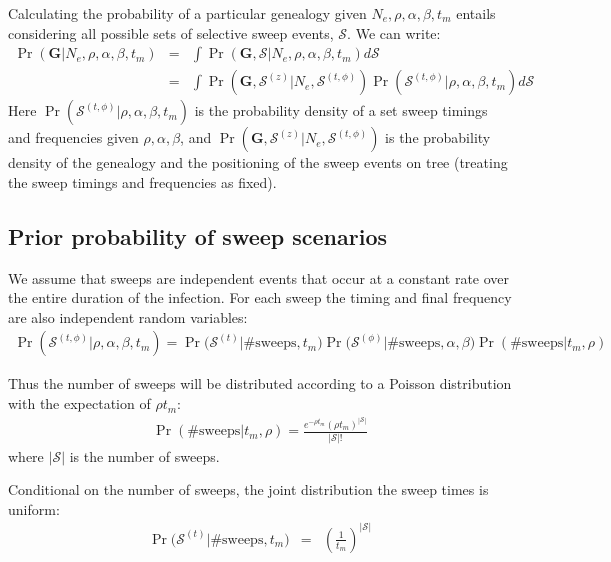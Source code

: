 \documentclass[letterpaper]{article}
\newcommand{\genealogy}{{\ensuremath{\mathbf{G}}}}
\newcommand{\popsize}{{\ensuremath{N_e}}}
\newcommand{\ratesweep}{{\ensuremath{\rho}}}
\newcommand{\sweepalpha}{{\ensuremath{\alpha}}}
\newcommand{\sweepbeta}{{\ensuremath{\beta}}}
\newcommand{\selectionmodel}{{\ensuremath{\ratesweep,\sweepalpha,\sweepbeta}}}
\newcommand{\entireSweepSet}{{\ensuremath{\mathcal{S}}}}
\newcommand{\sweepsetLocs}{{\ensuremath{\entireSweepSet^{(z)}}}}
\newcommand{\sweepsetTFs}{{\ensuremath{\entireSweepSet^{(t,\phi)}}}}
\begin{document}
Calculating the probability of a particular genealogy given $\popsize,\selectionmodel, t_m$ entails considering all possible sets of selective sweep events, $\entireSweepSet$.
We can write:
\begin{eqnarray}
\Pr(\genealogy | \popsize, \selectionmodel, t_m) & = & \int\Pr(\genealogy, \entireSweepSet | \popsize, \selectionmodel, t_m) d \entireSweepSet \\
& = & \int\Pr(\genealogy, \sweepsetLocs | \popsize, \sweepsetTFs)\Pr(\sweepsetTFs |\selectionmodel, t_m) d \entireSweepSet
\end{eqnarray}
Here $\Pr(\sweepsetTFs |\selectionmodel,t_m)$ is the probability density of a set sweep timings and frequencies given
$\selectionmodel$, and  $\Pr(\genealogy, \sweepsetLocs | \popsize, \sweepsetTFs)$ is the probability density of the genealogy and the positioning of the sweep events on tree (treating the sweep timings and frequencies as fixed).

\subsection{Prior probability of sweep scenarios}
We assume that sweeps are independent events that occur at a constant rate over the entire duration of the infection.
For each sweep the timing and final frequency are also independent random variables:
\begin{eqnarray}
\Pr(\sweepsetTFs |\selectionmodel,t_m) = \Pr\Big(\entireSweepSet^{(t)} \Big| \mbox{\# sweeps}, t_m\Big)\Pr\Big(\entireSweepSet^{(\phi)} \Big| \mbox{\# sweeps}, \sweepalpha, \sweepbeta\Big)\Pr(\mbox{\# sweeps}|t_m, \ratesweep)
\end{eqnarray}


Thus the number of sweeps will be distributed according to a Poisson distribution with the expectation of $\ratesweep t_m$:
\begin{eqnarray}
\Pr(\mbox{\# sweeps}|t_m, \ratesweep) = \frac{e^{-\ratesweep t_m}(\ratesweep t_m)^{| \entireSweepSet |}}{| \entireSweepSet |!}
\end{eqnarray}
where $| \entireSweepSet | $ is the number of sweeps.

Conditional on the number of sweeps, the joint distribution the sweep times is uniform:
\begin{eqnarray}
\Pr\Big(\entireSweepSet^{(t)} \Big| \mbox{\# sweeps}, t_m\Big) & = & \left(\frac{1}{t_m}\right)^{| \entireSweepSet |}
\end{eqnarray}
\end{document}

